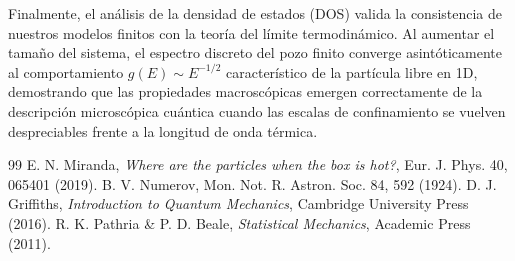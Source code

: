 \documentclass[twocolumn,superscriptaddress,prl,10pt]{revtex4-2}
\begin{document}
Finalmente, el análisis de la densidad de estados (DOS) valida la consistencia de nuestros modelos finitos con la teoría del límite termodinámico. Al aumentar el tamaño del sistema, el espectro discreto del pozo finito converge asintóticamente al comportamiento $g(E) \sim E^{-1/2}$ característico de la partícula libre en 1D, demostrando que las propiedades macroscópicas emergen correctamente de la descripción microscópica cuántica cuando las escalas de confinamiento se vuelven despreciables frente a la longitud de onda térmica.

\begin{thebibliography}{99}
 E. N. Miranda, \textit{Where are the particles when the box is hot?}, Eur. J. Phys. 40, 065401 (2019).
 B. V. Numerov, Mon. Not. R. Astron. Soc. 84, 592 (1924).
 D. J. Griffiths, \textit{Introduction to Quantum Mechanics}, Cambridge University Press (2016).
 R. K. Pathria \& P. D. Beale, \textit{Statistical Mechanics}, Academic Press (2011).
\end{thebibliography}
\end{document}
